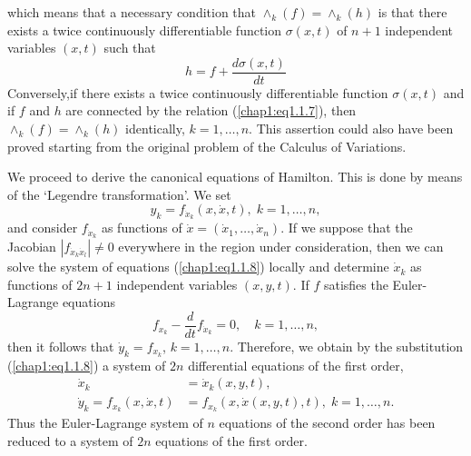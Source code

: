 which means that a necessary condition that $\wedge_k (f) = \wedge_k(h)$ is that there exists a twice continuously  differentiable function $\sigma (x,t)$ of $n+1$ independent variables $(x,t)$ such that 
\begin{equation*}
h = f+ \frac{d\sigma (x,t)}{dt}\tag{1.1.7}\label{chap1:eq1.1.7}
\end{equation*}
Conversely,\pageoriginale if there exists a twice continuously differentiable function $\sigma (x,t)$ and if $f$ and $h$ are connected by the relation (\ref{chap1:eq1.1.7}), then $\wedge_k (f) = \wedge_k(h)$ identically, $k=1, \ldots, n$. This assertion could also have been proved starting from the original problem of the Calculus of Variations.

We proceed to derive the canonical equations of Hamilton. This is done by means of the `Legendre transformation'. We set
\begin{equation*} 
y_k = f_{\dot{x}_k} (x, \dot{x},t), \; k = 1, \ldots, n, \tag{1.1.8}\label{chap1:eq1.1.8}
\end{equation*}
and consider $f_{\dot{x}_k}$ as functions of $\dot{x} = (\dot{x}_1, \ldots, \dot{x}_n)$. If we suppose that the Jacobian $|f_{\dot{x}_k \dot{x}_l}| \neq 0$ everywhere in the region under consideration, then we can solve the system of equations (\ref{chap1:eq1.1.8}) locally and determine $\dot{x}_k$ as functions of $2n+1$ independent variables $(x,y,t)$. If $f$ satisfies the Euler-Lagrange equations
$$
f_{x_k} - \frac{d}{dt} f_{\dot{x}_k} = 0, \quad k =1 , \ldots, n,
$$
then it follows that $\dot{y}_k = f_{x_k}$, $k =1,\ldots,n$. Therefore, we obtain by the substitution (\ref{chap1:eq1.1.8}) a system of $2n$ differential equations of the first order,
\begin{align*}
\dot{x}_k & = \dot{x}_k (x,y, t),\\
\dot{y}_k = f_{x_k} (x,\dot{x},t) & = f_{x_k} (x, \dot{x}(x, y, t), t), \; k = 1, \ldots, n. 
\end{align*}
Thus the Euler-Lagrange system of $n$ equations of the second order has been reduced to a system of $2n$ equations of the first order.

